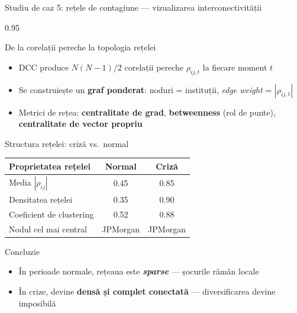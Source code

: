 \documentclass[9pt, aspectratio=169, t]{beamer}
\begin{document}
\begin{frame}{Studiu de caz 5: rețele de contagiune --- vizualizarea interconectivității}
    \begin{cminipage}{0.95\textwidth}
    {\footnotesize
    \begin{block}{De la corelații pereche la topologia rețelei}
        \begin{itemize}\setlength{\itemsep}{0pt}
            \item DCC produce $N(N-1)/2$ corelații pereche $\rho_{ij,t}$ la fiecare moment $t$
            \item Se construiește un \textbf{graf ponderat}: noduri = instituții, \textit{edge weight} = $|\rho_{ij,t}|$
            \item Metrici de rețea: \textbf{centralitate de grad}, \textbf{betweenness} (rol de punte), \textbf{centralitate de vector propriu}
        \end{itemize}
    \end{block}
    \vspace{-2mm}
    \begin{block}{Structura rețelei: criză vs.\ normal}
        {\small
        \begin{center}
        \begin{tabular}{l|cc}
            \hline
            \textbf{Proprietatea rețelei} & \textbf{Normal} & \textbf{Criză} \\
            \hline
            Media $|\rho_{ij}|$          & 0.45 & 0.85 \\
            Densitatea rețelei           & 0.35 & 0.90 \\
            Coeficient de clustering     & 0.52 & 0.88 \\
            Nodul cel mai central        & JPMorgan & JPMorgan \\
            \hline
        \end{tabular}
        \end{center}
        }
    \end{block}
    \vspace{-2mm}
    \begin{alertblock}{Concluzie}
        \begin{itemize}\setlength{\itemsep}{0pt}
            \item În perioade normale, rețeaua este \textbf{\textit{sparse}} --- șocurile rămân locale
            \item În crize, devine \textbf{densă și complet conectată} --- diversificarea devine imposibilă
        \end{itemize}
    \end{alertblock}
    }
    \end{cminipage}
\end{frame}
\end{document}

